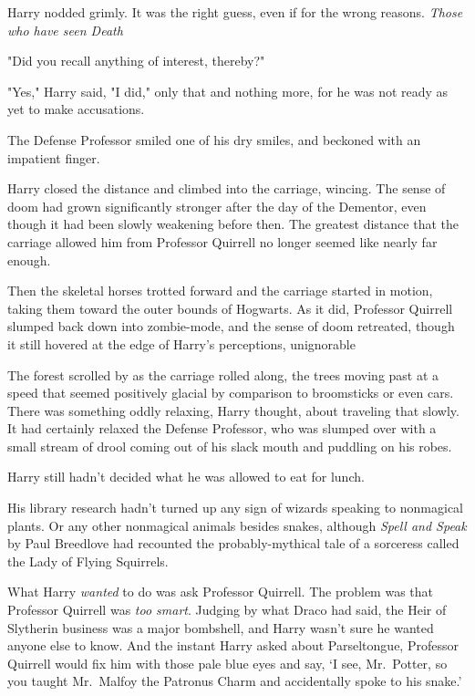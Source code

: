 Harry nodded grimly. It was the right guess, even if for the wrong reasons.
\emph{Those who have seen Death{\el}}

"Did you recall anything of interest, thereby?"

"Yes," Harry said, "I did," only that and nothing more, for he was not ready as
yet to make accusations.

The Defense Professor smiled one of his dry smiles, and beckoned with an
impatient finger.

Harry closed the distance and climbed into the carriage, wincing. The sense of
doom had grown significantly stronger after the day of the Dementor, even
though it had been slowly weakening before then. The greatest distance that the
carriage allowed him from Professor Quirrell no longer seemed like nearly far
enough.

Then the skeletal horses trotted forward and the carriage started in motion,
taking them toward the outer bounds of Hogwarts. As it did, Professor Quirrell
slumped back down into zombie-mode, and the sense of doom retreated, though it
still hovered at the edge of Harry's perceptions, unignorable{\el}

The forest scrolled by as the carriage rolled along, the trees moving past at a
speed that seemed positively glacial by comparison to broomsticks or even cars.
There was something oddly relaxing, Harry thought, about traveling that slowly.
It had certainly relaxed the Defense Professor, who was slumped over with a
small stream of drool coming out of his slack mouth and puddling on his robes.

Harry still hadn't decided what he was allowed to eat for lunch.

His library research hadn't turned up any sign of wizards speaking to
nonmagical plants. Or any other nonmagical animals besides snakes, although
\emph{Spell and Speak} by Paul Breedlove had recounted the probably-mythical
tale of a sorceress called the Lady of Flying Squirrels.

What Harry \emph{wanted} to do was ask Professor Quirrell. The problem was that
Professor Quirrell was \emph{too smart}. Judging by what Draco had said, the
Heir of Slytherin business was a major bombshell, and Harry wasn't sure he
wanted anyone else to know. And the instant Harry asked about Parseltongue,
Professor Quirrell would fix him with those pale blue eyes and say, `I see,
Mr.~Potter, so you taught Mr.~Malfoy the Patronus Charm and accidentally spoke
to his snake.'

